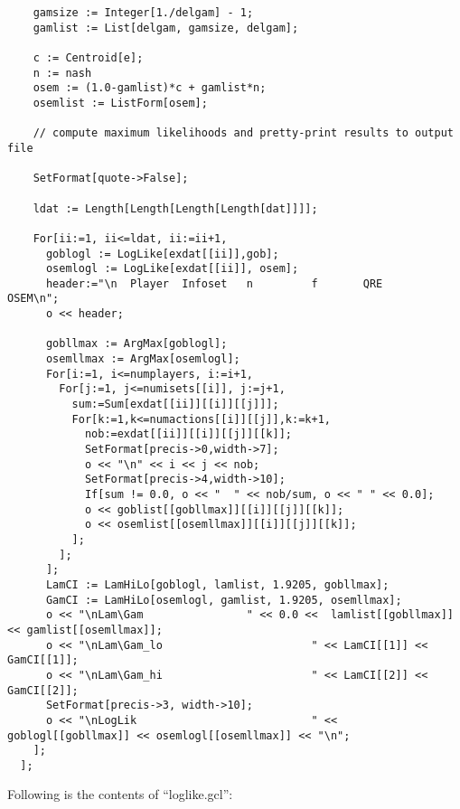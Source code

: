 {\begin{verbatim}
    gamsize := Integer[1./delgam] - 1;
    gamlist := List[delgam, gamsize, delgam];
  
    c := Centroid[e];
    n := nash
    osem := (1.0-gamlist)*c + gamlist*n;
    osemlist := ListForm[osem];

    // compute maximum likelihoods and pretty-print results to output file

    SetFormat[quote->False];

    ldat := Length[Length[Length[Length[dat]]]];

    For[ii:=1, ii<=ldat, ii:=ii+1,
      goblogl := LogLike[exdat[[ii]],gob];
      osemlogl := LogLike[exdat[[ii]], osem];
      header:="\n  Player  Infoset   n         f       QRE      OSEM\n";
      o << header;

      gobllmax := ArgMax[goblogl];
      osemllmax := ArgMax[osemlogl];
      For[i:=1, i<=numplayers, i:=i+1,
        For[j:=1, j<=numisets[[i]], j:=j+1,
          sum:=Sum[exdat[[ii]][[i]][[j]]];
          For[k:=1,k<=numactions[[i]][[j]],k:=k+1,
            nob:=exdat[[ii]][[i]][[j]][[k]];
            SetFormat[precis->0,width->7];
            o << "\n" << i << j << nob;
            SetFormat[precis->4,width->10];
            If[sum != 0.0, o << "  " << nob/sum, o << " " << 0.0];
            o << goblist[[gobllmax]][[i]][[j]][[k]];
            o << osemlist[[osemllmax]][[i]][[j]][[k]];
          ];
        ];
      ];
      LamCI := LamHiLo[goblogl, lamlist, 1.9205, gobllmax];
      GamCI := LamHiLo[osemlogl, gamlist, 1.9205, osemllmax];
      o << "\nLam\Gam                " << 0.0 <<  lamlist[[gobllmax]] << gamlist[[osemllmax]];
      o << "\nLam\Gam_lo                       " << LamCI[[1]] << GamCI[[1]];
      o << "\nLam\Gam_hi                       " << LamCI[[2]] << GamCI[[2]];
      SetFormat[precis->3, width->10];
      o << "\nLogLik                           " << goblogl[[gobllmax]] << osemlogl[[osemllmax]] << "\n";
    ];
  ];
\end{verbatim}
}

\noindent
Following is the contents of ``loglike.gcl'':


